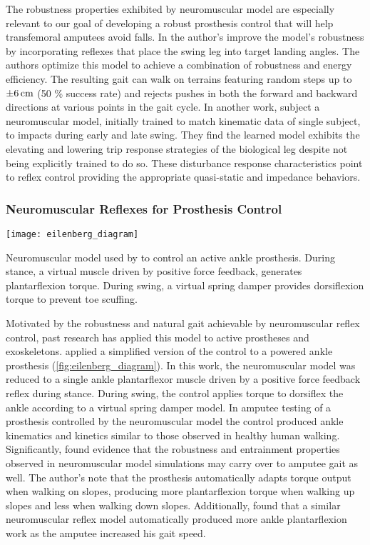 The robustness properties exhibited by neuromuscular model are especially
relevant to our goal of developing a robust prosthesis control that will help
transfemoral amputees avoid falls. In \citet{song2015neural} the author's
improve the model's robustness by incorporating reflexes that place the swing
leg into target landing angles. The authors optimize this model to achieve a
combination of robustness and energy efficiency.  The resulting gait can walk on
terrains featuring random steps up to $\unit[\pm 6]{cm}$ (50 \% success rate)
and rejects pushes in both the forward and backward directions at various points
in the gait cycle. In another work, \citet{murai2011neuromuscular} subject a
neuromuscular model, initially trained to match kinematic data of single
subject, to impacts during early and late swing. They find the learned model
exhibits the elevating and lowering trip response strategies of the biological
leg despite not being explicitly trained to do so. These disturbance response
characteristics point to reflex control providing the appropriate quasi-static
and impedance behaviors.

\subsubsection{Neuromuscular Reflexes for Prosthesis Control}
\begin{marginfigure}
    \centering
    \texttt{[image: eilenberg\_diagram]} \caption{Neuromuscular
    model used by \citet{eilenberg2010control} to control an active ankle
    prosthesis. During stance, a virtual muscle driven by positive force
    feedback, generates plantarflexion torque. During swing, a virtual spring
    damper provides dorsiflexion torque to prevent toe scuffing.}
    \label{fig:eilenberg_diagram}
\end{marginfigure}
Motivated by the robustness and natural gait achievable by neuromuscular
reflex control, past research has applied this model to active prostheses and
exoskeletons. \citet{eilenberg2010control} applied a simplified version of the
control to a powered ankle prosthesis (\cref{fig:eilenberg_diagram}). In this
work, the neuromuscular model was reduced to a single ankle plantarflexor muscle
driven by a positive force feedback reflex during stance. During swing, the
control applies torque to dorsiflex the ankle according to a virtual spring
damper model. In amputee testing of a prosthesis controlled by the neuromuscular
model the control produced ankle kinematics and kinetics similar to those
observed in healthy human walking. Significantly,
\citeauthor{eilenberg2010control} found evidence that the robustness and
entrainment properties observed in neuromuscular model simulations may carry
over to amputee gait as well. The author's note that the prosthesis
automatically adapts torque output when walking on slopes, producing more
plantarflexion torque when walking up slopes and less when walking down slopes.
Additionally, \citet{markowitz2011speed} found that a similar neuromuscular
reflex model automatically produced more ankle plantarflexion work as the
amputee increased his gait speed.

